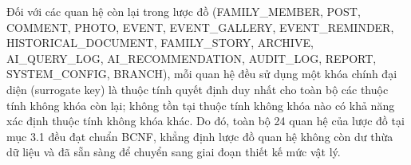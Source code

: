 Đối với các quan hệ còn lại trong lược đồ (FAMILY\_MEMBER, POST, COMMENT, PHOTO, EVENT, EVENT\_GALLERY, EVENT\_REMINDER, HISTORICAL\_DOCUMENT, FAMILY\_STORY, ARCHIVE, AI\_QUERY\_LOG, AI\_RECOMMENDATION, AUDIT\_LOG, REPORT, SYSTEM\_CONFIG, BRANCH), mỗi quan hệ đều sử dụng một khóa chính đại diện (surrogate key) là thuộc tính quyết định duy nhất cho toàn bộ các thuộc tính không khóa còn lại; không tồn tại thuộc tính không khóa nào có khả năng xác định thuộc tính không khóa khác. Do đó, toàn bộ 24 quan hệ của lược đồ tại mục 3.1 đều đạt chuẩn BCNF, khẳng định lược đồ quan hệ không còn dư thừa dữ liệu và đã sẵn sàng để chuyển sang giai đoạn thiết kế mức vật lý.

